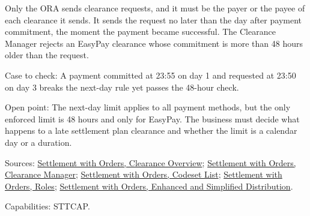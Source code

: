 \begin{definition}
  \label{def:accounting-clearance-request}
  \notready
  Only the ORA sends clearance requests, and it must be the payer or the
  payee of each clearance it sends. It sends the request no later than the
  day after payment commitment, the moment the payment became successful.
  The Clearance Manager rejects an EasyPay clearance whose commitment is
  more than 48 hours older than the request.

  Case to check: A payment committed at 23:55 on day 1 and requested at
  23:50 on day 3 breaks the next-day rule yet passes the 48-hour check.

  Open point: The next-day limit applies to all payment methods, but the
  only enforced limit is 48 hours and only for EasyPay. The business must
  decide what happens to a late settlement plan clearance and whether the
  limit is a calendar day or a duration.

  Sources: \href{https://standards.atlassian.net/wiki/spaces/SWO/pages/574653069}{Settlement with Orders, Clearance Overview};
  \href{https://standards.atlassian.net/wiki/spaces/SWO/pages/574259794}{Settlement with Orders, Clearance Manager};
  \href{https://standards.atlassian.net/wiki/spaces/SWO/pages/574456090}{Settlement with Orders, Codeset List};
  \href{https://standards.atlassian.net/wiki/spaces/SWO/pages/574816490}{Settlement with Orders, Roles};
  \href{https://standards.atlassian.net/wiki/spaces/SWO/pages/574653091}{Settlement with Orders, Enhanced and Simplified Distribution}.

  Capabilities: STTCAP.
\end{definition}

